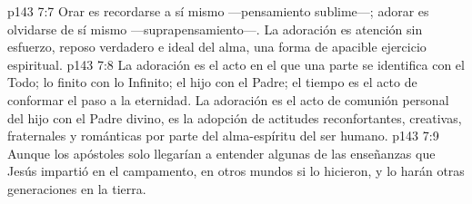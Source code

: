 \vs p143 7:7 \pc Orar es recordarse a sí mismo ---pensamiento sublime---; adorar es olvidarse de sí mismo ---suprapensamiento---. La adoración es atención sin esfuerzo, reposo verdadero e ideal del alma, una forma de apacible ejercicio espiritual.
\vs p143 7:8 \pc La adoración es el acto en el que una parte se identifica con el Todo; lo finito con lo Infinito; el hijo con el Padre; el tiempo es el acto de conformar el paso a la eternidad. La adoración es el acto de comunión personal del hijo con el Padre divino, es la adopción de actitudes reconfortantes, creativas, fraternales y románticas por parte del alma\hyp{}espíritu del ser humano.
\vs p143 7:9 \pc Aunque los apóstoles solo llegarían a entender algunas de las enseñanzas que Jesús impartió en el campamento, en otros mundos si lo hicieron, y lo harán otras generaciones en la tierra.
